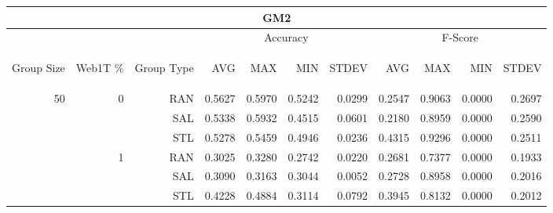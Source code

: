 \begin{center}
\begin{table}[htbp]
\begin{tabular}{ | r | r | r | r | r | r | r | r | r | r | r |}
\hline
\multicolumn{11}{|c|}{GM2}\\
\hline
 & & & \multicolumn{4}{|c|}{Accuracy} & \multicolumn{4}{|c|}{F-Score}\\ \cline{4-11}
\begin{sideways}Group Size\end{sideways} & \begin{sideways}Web1T \%\end{sideways} & \begin{sideways}Group Type\end{sideways} & \begin{sideways}AVG\end{sideways} & \begin{sideways}MAX\end{sideways} & \begin{sideways}MIN\end{sideways} & \begin{sideways}STDEV\end{sideways} & \begin{sideways}AVG\end{sideways} & \begin{sideways}MAX\end{sideways} & \begin{sideways}MIN\end{sideways} & \begin{sideways}STDEV\end{sideways}\\
\hline
\multirow{18}{*}{50}
 & \multirow{3}{*}{0} & RAN & 0.5627 & 0.5970 & 0.5242 & 0.0299 & 0.2547 & 0.9063 & 0.0000 & 0.2697\\ \cline{3-11}
 &   & SAL & 0.5338 & 0.5932 & 0.4515 & 0.0601 & 0.2180 & 0.8959 & 0.0000 & 0.2590\\ \cline{3-11}
 &   & STL & 0.5278 & 0.5459 & 0.4946 & 0.0236 & 0.4315 & 0.9296 & 0.0000 & 0.2511\\ \cline{2-11}
 & \multirow{3}{*}{1} & RAN & 0.3025 & 0.3280 & 0.2742 & 0.0220 & 0.2681 & 0.7377 & 0.0000 & 0.1933\\ \cline{3-11}
 &   & SAL & 0.3090 & 0.3163 & 0.3044 & 0.0052 & 0.2728 & 0.8958 & 0.0000 & 0.2016\\ \cline{3-11}
 &   & STL & 0.4228 & 0.4884 & 0.3114 & 0.0792 & 0.3945 & 0.8132 & 0.0000 & 0.2012\\ \cline{2-11}

\end{tabular}
\end{table}
\end{center}

